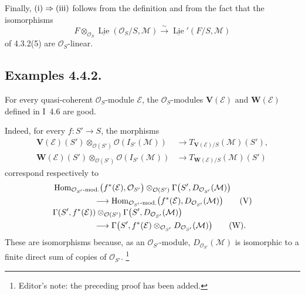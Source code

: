 Finally, \(\textup{(i)}\Rightarrow\textup{(iii)}\) follows from the
definition and from the
fact that the isomorphisms
\[
 F\otimes_{\mathcal O_S}
 \underline{\operatorname{Lie}}(\mathcal O_S/S,\mathcal M)
 \xrightarrow{\sim}
 \underline{\operatorname{Lie}}'(F/S,\mathcal M)
\]
of 4.3.2(5) are \(\mathcal O_S\)-linear.

\subsection*{Examples 4.4.2.}
For every quasi-coherent \(\mathcal O_S\)-module \(\mathcal E\), the
\(\mathcal O_S\)-modules \(\mathbf V(\mathcal E)\) and
\(\mathbf W(\mathcal E)\) defined in I~4.6 are good.

Indeed, for every \(f:S'\to S\), the morphisms
\[
\begin{aligned}
 \mathbf V(\mathcal E)(S')\otimes_{\mathcal O(S')}
   \mathcal O(I_{S'}(\mathcal M))
 &\longrightarrow T_{\mathbf V(\mathcal E)/S}(\mathcal M)(S'),\\
 \mathbf W(\mathcal E)(S')\otimes_{\mathcal O(S')}
   \mathcal O(I_{S'}(\mathcal M))
 &\longrightarrow T_{\mathbf W(\mathcal E)/S}(\mathcal M)(S')
\end{aligned}
\]
correspond respectively to
\[
\begin{aligned}
 &\operatorname{Hom}_{\mathcal O_{S'}\text{-mod.}}
   \bigl(f^*(\mathcal E),\mathcal O_{S'}\bigr)
 \otimes_{\mathcal O(S')}
 \Gamma\bigl(S',D_{\mathcal O_{S'}}(\mathcal M)\bigr)\\
 &\hspace{5em}\longrightarrow
 \operatorname{Hom}_{\mathcal O_{S'}\text{-mod.}}
   \bigl(f^*(\mathcal E),D_{\mathcal O_{S'}}(\mathcal M)\bigr)
 \qquad\textup{(V)}
\\[-2pt]
 &\Gamma(S',f^*(\mathcal E))
 \otimes_{\mathcal O(S')}
 \Gamma\bigl(S',D_{\mathcal O_{S'}}(\mathcal M)\bigr)\\
 &\hspace{5em}\longrightarrow
 \Gamma\bigl(S',f^*(\mathcal E)
   \otimes_{\mathcal O_{S'}}D_{\mathcal O_{S'}}(\mathcal M)\bigr)
 \qquad\textup{(W)}.
\end{aligned}
\]
These are isomorphisms because, as an \(\mathcal O_{S'}\)-module,
\(D_{\mathcal O_{S'}}(\mathcal M)\) is isomorphic to a finite direct
sum of copies of \(\mathcal O_{S'}\).
\footnote{Editor's note: the preceding proof has been added.}

